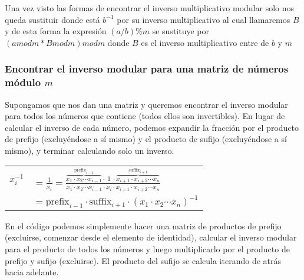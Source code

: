 Una vez visto las formas de encontrar el inverso multiplicativo modular solo nos queda sustituir donde está $b^{-1}$ por su inverso multiplicativo al cual llamaremos $B$ y de esta forma la expresión $(a/b) \% m$ se sustituye por $(a mod m * B mod m) mod m$ donde $B$ es el inverso multiplicativo entre de $b$ y $m$ 

\subsubsection{Encontrar el inverso modular para una matriz de números módulo $m$}

Supongamos que nos dan una matriz y queremos encontrar el inverso modular para todos los números que contiene (todos ellos son invertibles). En lugar de calcular el inverso de cada número, podemos expandir la fracción por el producto de prefijo (excluyéndose a sí mismo) y el producto de sufijo (excluyéndose a sí mismo), y terminar calculando solo un inverso.


\begin{longtable}{rl}
	$x_i^{-1}$ & $= \frac{1}{x_i} = \frac{\overbrace{x_1 \cdot x_2 \cdots x_{i-1}}^{\text{prefix}_{i-1}} \cdot ~1~ \cdot \overbrace{x_{i+1} \cdot x_{i+2} \cdots x_n}^{\text{suffix}_{i+1}}}{x_1 \cdot x_2 \cdots x_{i-1} \cdot x_i \cdot x_{i+1} \cdot x_{i+2} \cdots x_n}$ \\
	& $= \text{prefix}_{i-1} \cdot \text{suffix}_{i+1} \cdot \left(x_1 \cdot x_2 \cdots x_n\right)^{-1}$ \\
\end{longtable}


En el código podemos simplemente hacer una matriz de productos de prefijo (excluirse, comenzar desde el elemento de identidad), calcular el inverso modular para el producto de todos los números y luego multiplicarlo por el producto de prefijo y sufijo (excluirse). El producto del sufijo se calcula iterando de atrás hacia adelante.